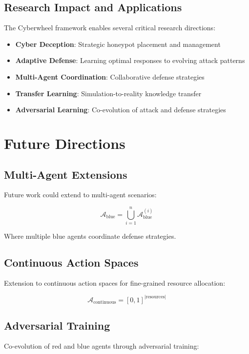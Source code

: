 \documentclass[12pt,a4paper]{article}
\begin{document}
\subsection{Research Impact and Applications}
The Cyberwheel framework enables several critical research directions:

\begin{itemize}
    \item \textbf{Cyber Deception}: Strategic honeypot placement and management
    \item \textbf{Adaptive Defense}: Learning optimal responses to evolving attack patterns  
    \item \textbf{Multi-Agent Coordination}: Collaborative defense strategies
    \item \textbf{Transfer Learning}: Simulation-to-reality knowledge transfer
    \item \textbf{Adversarial Learning}: Co-evolution of attack and defense strategies
\end{itemize}

\section{Future Directions}

\subsection{Multi-Agent Extensions}
Future work could extend to multi-agent scenarios:

\begin{equation}
\mathcal{A}_{\text{blue}} = \bigcup_{i=1}^{n} \mathcal{A}_{\text{blue}}^{(i)}
\end{equation}

Where multiple blue agents coordinate defense strategies.

\subsection{Continuous Action Spaces}
Extension to continuous action spaces for fine-grained resource allocation:

\begin{equation}
\mathcal{A}_{\text{continuous}} = [0,1]^{|\text{resources}|}
\end{equation}

\subsection{Adversarial Training}
Co-evolution of red and blue agents through adversarial training:
\end{document}
